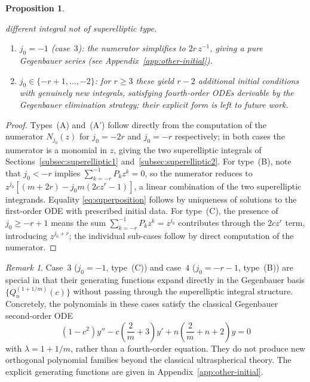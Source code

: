 \documentclass[final,nopreprintline]{elsarticle}
\newtheorem{proposition}[theorem]{Proposition}
\theoremstyle{definition}
\numberwithin{equation}{section}
\theoremstyle{remark}
\newtheorem{remark}[theorem]{Remark}
\begin{document}
\begin{proposition}
\begin{enumerate}[\rm(A)]
    different integral not of superelliptic type.
    \begin{enumerate}[\rm(i)]
    \item $j_0=-1$ (case~$3$): the numerator simplifies to $2r\,z^{-1}$, giving a pure
        Gegenbauer series (see Appendix~\ref{app:other-initial}).
    \item $j_0\in\{-r+1,\ldots,-2\}$: for $r\ge3$ these yield $r-2$ additional initial
        conditions with genuinely new integrals, satisfying fourth-order ODEs derivable
        by the Gegenbauer elimination strategy; their explicit form is left to future work.
    \end{enumerate}
\end{enumerate}
\end{proposition}

\begin{proof}
Types~(A) and~(A') follow directly from the computation of the numerator $N_{j_0}(z)$
for $j_0=-2r$ and $j_0=-r$ respectively; in both cases the numerator is a monomial in $z$,
giving the two superelliptic integrals of Sections~\ref{subsec:superelliptic1}
and~\ref{subsec:superelliptic2}.
For type~(B), note that $j_0 < -r$ implies $\sum_{k=-r}^{-1}P_k z^k = 0$, so the
numerator reduces to $z^{j_0}[(m+2r)-j_0 m(2cz^r-1)]$, a linear combination of the
two superelliptic integrands. Equality \eqref{eq:superposition} follows by uniqueness
of solutions to the first-order ODE with prescribed initial data.
For type~(C), the presence of $j_0\ge-r+1$ means the sum $\sum_{k=-r}^{-1}P_k z^k = z^{j_0}$
contributes through the $2cz^r$ term, introducing $z^{j_0+r}$; the individual sub-cases
follow by direct computation of the numerator.
\end{proof}

\begin{remark}\label{rem:gegenbauer-reduction}
Case~$3$ ($j_0=-1$, type~(C)) and case~$4$ ($j_0=-r-1$, type~(B)) are special in that
their generating functions expand directly in the Gegenbauer basis
$\{Q_n^{(1+1/m)}(c)\}$ without passing through the superelliptic integral structure.
Concretely, the polynomials in these cases satisfy the classical Gegenbauer
second-order ODE
\[
(1-c^2)y'' - c\!\left(\frac{2}{m}+3\right)y' + n\!\left(\frac{2}{m}+n+2\right)y = 0
\]
with $\lambda = 1+1/m$, rather than a fourth-order equation. They do not produce new
orthogonal polynomial families beyond the classical ultraspherical theory. The explicit
generating functions are given in Appendix~\ref{app:other-initial}.
\end{remark}
\end{document}
